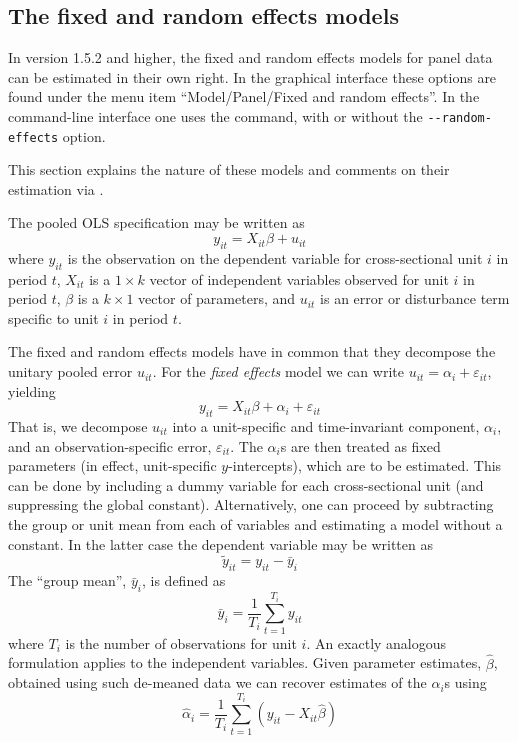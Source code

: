 \subsection{The fixed and random effects models}
\label{panel-est}

In  version 1.5.2 and higher, the fixed and random effects
models for panel data can be estimated in their own right.  In the
graphical interface these options are found under the menu item
``Model/Panel/Fixed and random effects''.  In the command-line
interface one uses the  command, with or without the
\verb+--random-effects+ option.

This section explains the nature of these models and comments on their
estimation via .

The pooled OLS specification may be written as 
\begin{equation}
\label{eq:pooled}
y_{it} = X_{it}\beta + u_{it}
\end{equation}
where $y_{it}$ is the observation on the dependent variable for
cross-sectional unit $i$ in period $t$, $X_{it}$ is a $1\times k$
vector of independent variables observed for unit $i$ in period $t$,
$\beta$ is a $k\times 1$ vector of parameters, and $u_{it}$ is an error
or disturbance term specific to unit $i$ in period $t$.

The fixed and random effects models have in common that they decompose
the unitary pooled error $u_{it}$.  For the \textsl{fixed effects}
model we can write $u_{it} = \alpha_i + \varepsilon_{it}$, yielding
\begin{equation}
\label{eq:FE}
y_{it} = X_{it}\beta + \alpha_i + \varepsilon_{it}
\end{equation}
That is, we decompose $u_{it}$ into a unit-specific and time-invariant
component, $\alpha_i$, and an observation-specific error,
$\varepsilon_{it}$.  The $\alpha_i$s are then treated as fixed
parameters (in effect, unit-specific $y$-intercepts), which are to be
estimated.  This can be done by including a dummy variable for each
cross-sectional unit (and suppressing the global constant).
Alternatively, one can proceed by subtracting the group or unit mean
from each of variables and estimating a model without a constant.  In
the latter case the dependent variable may be written as
\[
\tilde{y}_{it} = y_{it} - \bar{y}_i
\]
The ``group mean'', $\bar{y}_i$, is defined as
\[
\bar{y}_i = \frac{1}{T_i} \sum_{t=1}^{T_i} y_{it}
\]
where $T_i$ is the number of observations for unit $i$.  An exactly
analogous formulation applies to the independent variables.  Given
parameter estimates, $\hat{\beta}$, obtained using such de-meaned data
we can recover estimates of the $\alpha_i$s using
\[
\hat{\alpha}_i = \frac{1}{T_i} \sum_{t=1}^{T_i} 
   \left(y_{it} - X_{it}\hat{\beta}\right)
\]

